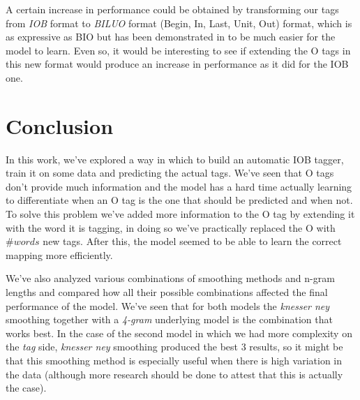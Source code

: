\documentclass[11pt,a4paper]{article}
\begin{document}
	A certain increase in performance could be obtained by transforming our tags from \textit{IOB} format to \textit{BILUO} format (Begin, In, Last, Unit, Out) format, which is as expressive as BIO but has been demonstrated in \cite{DesignChallenges} to be much easier for the model to learn. Even so, it would be interesting to see if extending the O tags in this new format would produce an increase in performance as it did for the IOB one.
	

\section{Conclusion}
	
	In this work, we've explored a way in which to build an automatic IOB tagger, train it on some data and predicting the actual tags. We've seen that O tags don't provide much information and the model has a hard time actually learning to differentiate when an O tag is the one that should be predicted and when not. To solve this problem we've added more information to the O tag by extending it with the word it is tagging, in doing so we've practically replaced the O with $\#words$ new tags. After this, the model seemed to be able to learn the correct mapping more efficiently.
	
	We've also analyzed various combinations of smoothing methods and n-gram lengths and compared how all their possible combinations affected the final performance of the model. We've seen that for both models the \textit{knesser ney} smoothing together with a \textit{4-gram} underlying model is the combination that works best. In the case of the second model in which we had more complexity on the \textit{tag} side, \textit{knesser ney} smoothing produced the best 3 results, so it might be that this smoothing method is especially useful when there is high variation in the data (although more research should be done to attest that this is actually the case).




%

%


%
\end{document}

